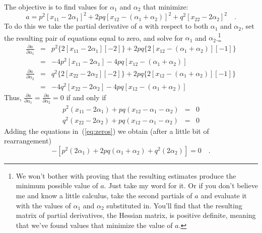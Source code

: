 The objective is to find values for $\alpha_1$ and $\alpha_2$ that
minimize:
\[
a = p^2[x_{11}-2\alpha_1]^2
       + 2pq[x_{12}-(\alpha_1+\alpha_2)]^2
       + q^2[x_{22}-2\alpha_2]^2 \quad .
\]
To do this we take the partial derivative of $a$ with respect to both
$\alpha_1$ and $\alpha_2$, set the resulting pair of equations equal
to zero, and solve for $\alpha_1$ and $\alpha_2$.\footnote{We won't
  bother with proving that the resulting estimates produce the minimum
  possible value of $a$. Just take my word for it. Or if you don't
  believe me and know a little calculus, take the second partials of
  $a$ and evaluate it with the values of $\alpha_1$ and $\alpha_2$
  substituted in. You'll find that the resulting matrix of partial
  derivatives, the Hessian matrix, is positive definite, meaning that
  we've found values that minimize the value of $a$.}
\begin{eqnarray*}
\frac{\partial a}{\partial{\alpha_1}} &=& p^2\{2[x_{11} - 2\alpha_1][-2]\}
                     + 2pq\{2[x_{12} - (\alpha_1+\alpha_2)][-1]\} \\
                  &=& -4p^2[x_{11} - 2\alpha_1]
                     -4pq[x_{12} - (\alpha_1+\alpha_2)] \\
\frac{\partial a}{\partial{\alpha_2}} &=& q^2\{2[x_{22} - 2\alpha_2][-2]\}
                     + 2pq\{2[x_{12} - (\alpha_1+\alpha_2)][-1]\} \\
                  &=& -4q^2[x_{22} - 2\alpha_2]
                     -4pq[x_{12} - (\alpha_1+\alpha_2)] 
\end{eqnarray*}
Thus, $\frac{\partial a}{\partial{\alpha_1}} = \frac{\partial a}{\partial{\alpha_2}} = 0$ if and only if
\begin{eqnarray}
p^2(x_{11} - 2\alpha_1) + pq(x_{12} - \alpha_1 - \alpha_2) &=& 0
  \nonumber \\
q^2(x_{22} - 2\alpha_2) + pq(x_{12} - \alpha_1 - \alpha_2) &=& 0
\label{eq:zeros}
\end{eqnarray}
Adding the equations in~(\ref{eq:zeros}) we obtain (after a little bit
of rearrangement)
\begin{equation}
[p^2x_{11} + 2pqx_{12} + q^2x_{22}] -
   [p^2(2\alpha_1) + 2pq(\alpha_1 + \alpha_2) + q^2(2\alpha_2)] = 0 \quad .
\label{eq:basic}
\end{equation}

